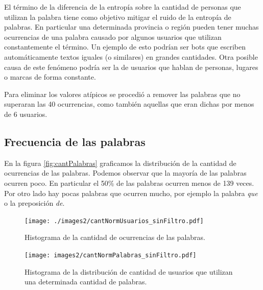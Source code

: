 El término de la diferencia de la entropía sobre la cantidad de personas que utilizan la palabra tiene como objetivo mitigar el ruido de la entropía de palabras. En particular una determinada provincia o región pueden tener muchas ocurrencias de una palabra causado por algunos usuarios que utilizan constantemente el término. Un ejemplo de esto podrían ser bots que escriben automáticamente textos iguales (o similares) en grandes cantidades. Otra posible causa de este fenómeno podría ser la de usuarios que hablan de personas, lugares o marcas de forma constante.

Para eliminar los valores atípicos se procedió a remover las palabras que no superaran las 40 ocurrencias, como también aquellas que eran dichas por menos de 6 usuarios. 

\subsection{Frecuencia de las palabras}
\label{sub: frecuenciaPalabras}
En la figura \ref{fig:cantPalabras} graficamos la distribución de la cantidad de ocurrencias de las palabras. Podemos observar que la mayoría de las palabras ocurren poco. En particular el 50\% de las palabras ocurren menos de 139 veces. Por otro lado hay pocas palabras que ocurren mucho, por ejemplo la palabra \textit{que} o la preposición \textit{de}.


\begin{figure}[!ht]\centering
  \begin{minipage}{0.49\textwidth}
    \texttt{[image: ./images2/cantNormUsuarios\_sinFiltro.pdf]}
    \caption{Histograma de la cantidad de ocurrencias de las palabras.} 
    \label{fig:cantNormUsuarios} 
   \end{minipage}
   \begin{minipage}{0.49\textwidth}
    \texttt{[image: images2/cantNormPalabras\_sinFiltro.pdf]}
    \caption{Histograma de la distribución de cantidad de usuarios que utilizan una determinada cantidad de palabras.} 
    \label{fig:cantNormPalabras} 
   \end{minipage}
   
\end{figure}


